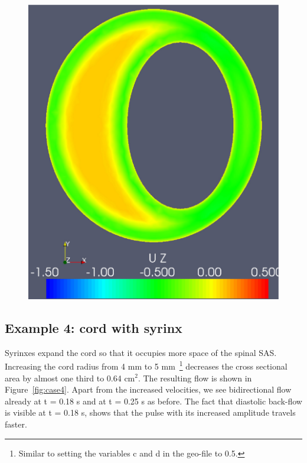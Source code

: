 \begin{figure}
{            \includegraphics[width=\threefigsfull]{chapters/hentschel/pdf/pulse_f1_08_elliptic_eccentric_diamin1_nmb25.pdf}}
\end{figure}

\subsection{Example 4: cord with syrinx}

Syrinxes expand the cord so that it occupies more space of the spinal
SAS. Increasing the cord radius from 4 mm to 5 mm~\footnote{Similar to
setting the variables c and d in the geo-file to 0.5.} decreases the
cross sectional area by almost one third to 0.64 $\mathrm{cm^2}$. The
resulting flow is shown in Figure~\ref{fig:case4}. Apart from the
increased velocities, we see bidirectional flow already at t = 0.18 s
and at t = 0.25 s as before. The fact that diastolic back-flow is
visible at t = 0.18 s, shows that the pulse with its increased
amplitude travels faster.

